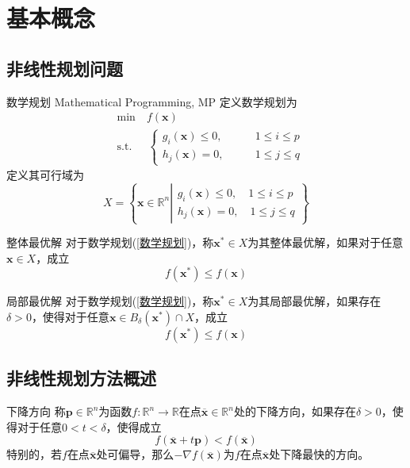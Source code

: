 \documentclass[lang = cn, scheme = chinese, thmcnt = section]{elegantbook}
\newcommand{\R}{\mathbb{R}}            %
\newcommand{\bs}{\boldsymbol}          %
\begin{document}
\section{基本概念}

\subsection{非线性规划问题}

\begin{definition}{数学规划 Mathematical Programming, MP}
	定义数学规划为
	\begin{align*}\label{数学规划}
		& \text{min}  \quad f(\bs{x})\\
		& \text{s.t.} \;\, \quad \begin{cases}
			g_i(\bs{x})\le 0,\qquad & 1\le i \le p\\
			h_j(\bs{x})=0,\qquad & 1\le j \le q
		\end{cases}\tag{*}
	\end{align*}
	定义其可行域为
	$$
	X=\left\{ 
	\bs{x}\in\R^n\left|
	\begin{aligned}
		g_i(\bs{x})\le 0,\quad 1\le i \le p\\
		h_j(\bs{x})=0,\quad 1\le j \le q
	\end{aligned}\right.
	 \right\}
	$$
\end{definition}

\begin{definition}{整体最优解}
	对于数学规划(\ref{数学规划})，称$\bs{x}^*\in X$为其整体最优解，如果对于任意$\bs{x}\in X$，成立
	$$
	f(\bs{x}^*)\le f(\bs{x})
	$$
\end{definition}

\begin{definition}{局部最优解}
	对于数学规划(\ref{数学规划})，称$\bs{x}^*\in X$为其局部最优解，如果存在$\delta>0$，使得对于任意$\bs{x}\in B_{\delta}(\bs{x}^*)\cap X$，成立
	$$
	f(\bs{x}^*)\le f(\bs{x})
	$$
\end{definition}

\subsection{非线性规划方法概述}

\begin{definition}{下降方向}
	称$\bs{p}\in\R^n$为函数$f:\R^n\to\R$在点$\overline{\bs{x}}\in\R^n$处的下降方向，如果存在$\delta>0$，使得对于任意$0<t<\delta$，使得成立
	$$
	f(\overline{\bs{x}}+t\bs{p})<f(\overline{\bs{x}})
	$$
	特别的，若$f$在点$\overline{\bs{x}}$处可偏导，那么$-\nabla f(\overline{\bs{x}})$为$f$在点$\overline{\bs{x}}$处下降最快的方向。
\end{definition}
\end{document}
